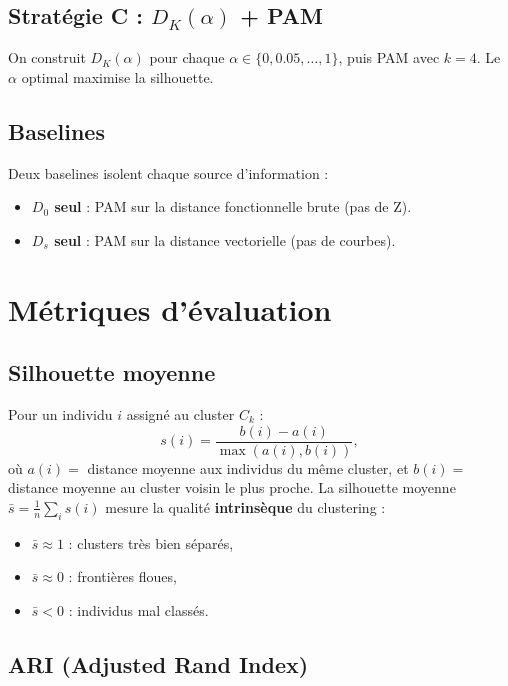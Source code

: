 \documentclass[11pt, a4paper]{article}
\newcommand{\DK}{D_K}
\theoremstyle{definition}
\theoremstyle{remark}
\begin{document}
\subsection{Stratégie C : $\DK(\alpha)$ + PAM}

On construit $\DK(\alpha)$ pour chaque $\alpha \in \{0, 0.05, \ldots, 1\}$, puis
PAM avec $k = 4$. Le $\alpha$ optimal maximise la silhouette.

\subsection{Baselines}

Deux baselines isolent chaque source d'information :
\begin{itemize}[nosep]
  \item \textbf{$D_0$ seul} : PAM sur la distance fonctionnelle brute (pas de Z).
  \item \textbf{$D_s$ seul} : PAM sur la distance vectorielle (pas de courbes).
\end{itemize}

\section{Métriques d'évaluation}
\label{sec:eval}

\subsection{Silhouette moyenne}

Pour un individu $i$ assigné au cluster $C_k$ :
\[
  s(i) = \frac{b(i) - a(i)}{\max(a(i), b(i))},
\]
où $a(i) = $ distance moyenne aux individus du même cluster, et $b(i) = $
distance moyenne au cluster voisin le plus proche. La silhouette moyenne
$\bar{s} = \frac{1}{n}\sum_i s(i)$ mesure la qualité \textbf{intrinsèque}
du clustering :
\begin{itemize}[nosep]
  \item $\bar{s} \approx 1$ : clusters très bien séparés,
  \item $\bar{s} \approx 0$ : frontières floues,
  \item $\bar{s} < 0$ : individus mal classés.
\end{itemize}

\subsection{ARI (Adjusted Rand Index)}
\label{sec:ari}
\end{document}
